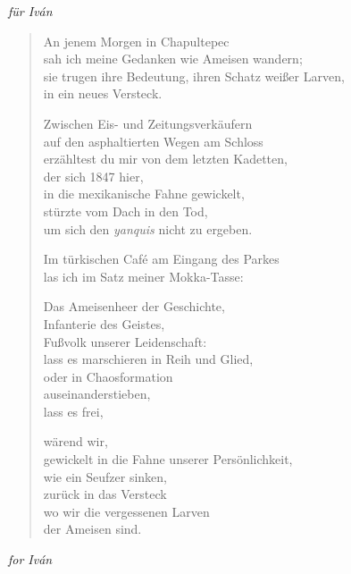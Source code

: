 
\cleartoverso


\hspace{2em}\emph{für Iván}

\begin{verse}

An jenem Morgen in Chapultepec\\
sah ich meine Gedanken wie Ameisen wandern;\\
sie trugen ihre Bedeutung, ihren Schatz weißer Larven,\\
in ein neues Versteck.

Zwischen Eis- und Zeitungsverkäufern\\
auf den asphaltierten Wegen am Schloss\\
erzähltest du mir von dem letzten Kadetten,\\
der sich 1847 hier,\\
in die mexikanische Fahne gewickelt,\\
stürzte vom Dach in den Tod,\\
um sich den \emph{yanquis} nicht zu ergeben.

Im türkischen Café am Eingang des Parkes\\
las ich im Satz meiner Mokka-Tasse:

Das Ameisenheer der Geschichte,\\
Infanterie des Geistes,\\
Fußvolk unserer Leidenschaft:\\
lass es marschieren in Reih und Glied,\\
oder in Chaosformation\\
auseinanderstieben,\\
lass es frei,

wärend wir,\\
gewickelt in die Fahne unserer Persönlichkeit,\\
wie ein Seufzer sinken,\\
zurück in das Versteck\\
wo wir die vergessenen Larven\\
der Ameisen sind.

\end{verse}

\clearpage


\hspace{2em}\emph{for Iván}

